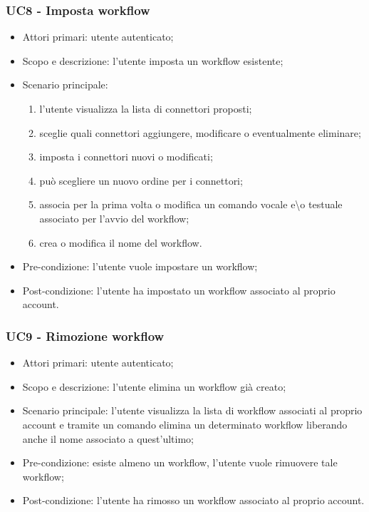 \subsubsection{UC8 - Imposta workflow}
\begin{itemize}
	\item  Attori primari: utente autenticato;
	\item  Scopo e descrizione: l'utente imposta un workflow esistente;
	\item  Scenario principale:  
	\begin{enumerate}
		\item l'utente visualizza la lista di connettori proposti;
		\item sceglie quali connettori aggiungere, modificare o eventualmente eliminare;
		\item imposta i connettori nuovi o modificati;
		\item può scegliere un nuovo ordine per i connettori;
		\item associa per la prima volta o modifica un comando vocale e\textbackslash o testuale associato per l'avvio del workflow;
		\item crea o modifica il nome del workflow.
	\end{enumerate}
	\item  Pre-condizione: l'utente vuole impostare un workflow;
	\item  Post-condizione: l'utente ha impostato un workflow associato al proprio account.
\end{itemize}
\subsubsection{UC9 - Rimozione workflow}
\begin{itemize}
	\item  Attori primari: utente autenticato;
	\item  Scopo e descrizione: l'utente elimina un workflow già creato;
	\item  Scenario principale: l'utente visualizza la lista di workflow associati al proprio account e tramite un comando elimina un determinato workflow liberando anche il nome associato a quest'ultimo;
	\item  Pre-condizione: esiste almeno un workflow, l'utente vuole rimuovere tale workflow;
	\item  Post-condizione: l'utente ha rimosso un workflow associato al proprio account.
\end{itemize}

